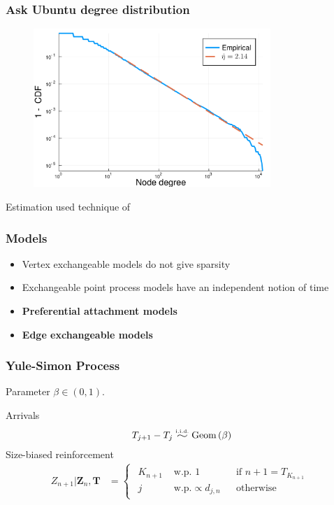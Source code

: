 \documentclass[final,hyperref={pdfpagelabels=false},noamsthm]{beamer}
\newcommand{\ee}{Z} %
\newcommand{\bfee}{\mathbf{\ee}}
\newcommand{\bfT}{\mathbf{T}}
\newcommand{\simiid}{\overset{\scriptscriptstyle{\text{i.i.d.}}}{\widesim}}
\newcommand{\widesim}[1][1.5]{
	\mathrel{\scalebox{#1}[1]{$\sim$}}
}
\begin{document}
\begin{frame}
	\frametitle{Ask Ubuntu degree distribution}
	\begin{figure}[h]
		\includegraphics[width=0.8\textwidth]{fig/nodes_degre_power_law_askubuntu.pdf}
	\end{figure}
	
	Estimation used technique of \cite{clauset}
	
\end{frame}


\begin{frame}
	\frametitle{Models}
	\begin{itemize}
		\item Vertex exchangeable models do not give sparsity \cite{aldous1981} \cite{hoover1979}
		\item Exchangeable point process models \cite{caronfox} have an independent notion of time
		\pause
		\item \textbf{Preferential attachment models} \cite{barabasi1999}
		\item \textbf{Edge exchangeable models} \cite{CraneDempsey2017} \cite{cai2016}
	\end{itemize}
\end{frame}

\begin{frame}
	\frametitle{Yule-Simon Process}
	Parameter $\beta \in (0, 1)$.
	\vspace{15pt}
	
	Arrivals
	\begin{align*}
	T_{j+1} - T_{j} \simiid \text{Geom}\left( \beta \right)
	\end{align*}
	Size-biased reinforcement
	\begin{align*} 
	\ee_{n+1} | \bfee_{n}, \bfT &= \begin{cases}\begin{aligned}
	K_{n+1} & \text{ w.p. } 1 && \text{if } n+1 = T_{K_{n+1}} \\
	j &\text{ w.p.} \propto d_{j,n} && \text{otherwise} 
	\end{aligned}\end{cases}
	\label{eq:ys}
	\end{align*}
\end{frame}
\end{document}
